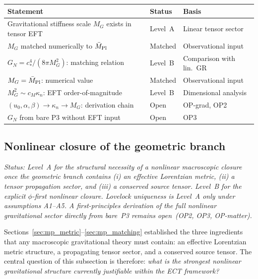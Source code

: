 \begin{center}
\renewcommand{\arraystretch}{1.4}\small
\begin{tabular}{p{6.8cm}p{2.5cm}p{2.5cm}}
\hline\hline
Statement & Status & Basis \\
\hline
Gravitational stiffness scale $M_G$ exists in tensor EFT
  & Level~A & Linear tensor sector \\
$M_G$ matched numerically to $\bar M_{\rm Pl}$
  & Matched & Observational input \\
$G_N=c_*^4/(8\pi M_G^2)$: matching relation
  & Level~B & Comparison with lin.\ GR \\
$M_G=\bar M_{\rm Pl}$: numerical value
  & Matched & Observational input \\
$M_G^2\sim c_M\kappa_n$: EFT order-of-magnitude
  & Level~B & Dimensional analysis \\
$(u_0,\alpha,\beta)\to\kappa_n\to M_G$: derivation chain
  & Open & OP-grad, OP2 \\
$G_N$ from bare P3 without EFT input
  & Open & OP3 \\
\hline\hline
\end{tabular}
\end{center}




\subsection{Nonlinear closure of the geometric branch}
\label{sec:mp_nonlinear}

\textit{Status: Level~A for the structural necessity of a nonlinear
macroscopic closure once the geometric branch contains
(i) an effective Lorentzian metric, (ii) a tensor propagation sector,
and (iii) a conserved source tensor.
Level~B for the explicit $\phi$-first nonlinear closure.
Lovelock uniqueness is Level~A only under assumptions A1--A5.
A first-principles derivation of the full nonlinear gravitational
sector directly from bare~P3 remains open~(OP2, OP3, OP-matter).}

\medskip
Sections~\ref{sec:mp_metric}--\ref{sec:mp_matching} established the
three ingredients that any macroscopic gravitational theory must
contain: an effective Lorentzian metric structure, a propagating tensor
sector, and a conserved source tensor.
The central question of this subsection is therefore:
\emph{what is the strongest nonlinear gravitational structure currently
justifiable within the ECT framework?}

